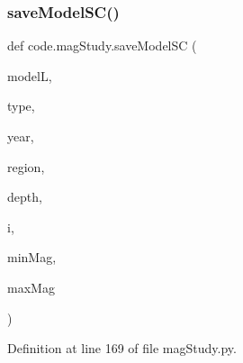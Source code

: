 \subsubsection{\texorpdfstring{save\+Model\+S\+C()}{saveModelSC()}}
{\footnotesize\ttfamily def code.\+mag\+Study.\+save\+Model\+SC (\begin{DoxyParamCaption}\item[{}]{modelL,  }\item[{}]{type,  }\item[{}]{year,  }\item[{}]{region,  }\item[{}]{depth,  }\item[{}]{i,  }\item[{}]{min\+Mag,  }\item[{}]{max\+Mag }\end{DoxyParamCaption})}



Definition at line 169 of file mag\+Study.\+py.

